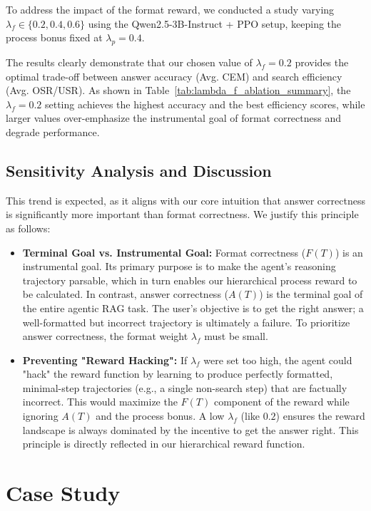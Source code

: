 \documentclass{article}
\begin{document}
To address the impact of the format reward, we conducted a study varying $\lambda_f \in \{0.2, 0.4, 0.6\}$ using the Qwen2.5-3B-Instruct + PPO setup, keeping the process bonus fixed at $\lambda_p = 0.4$.

The results clearly demonstrate that our chosen value of $\lambda_f = 0.2$ provides the optimal trade-off between answer accuracy (Avg. CEM) and search efficiency (Avg. OSR/USR). As shown in Table~\ref{tab:lambda_f_ablation_summary}, the $\lambda_f = 0.2$ setting achieves the highest accuracy and the best efficiency scores, while larger values over-emphasize the instrumental goal of format correctness and degrade performance.


\subsection{Sensitivity Analysis and Discussion}
This trend is expected, as it aligns with our core intuition that answer correctness is significantly more important than format correctness. We justify this principle as follows:

\begin{itemize}
 \item \textbf{Terminal Goal vs. Instrumental Goal:} Format correctness ($F(T)$) is an instrumental goal. Its primary purpose is to make the agent's reasoning trajectory parsable, which in turn enables our hierarchical process reward to be calculated. In contrast, answer correctness ($A(T)$) is the terminal goal of the entire agentic RAG task. The user's objective is to get the right answer; a well-formatted but incorrect trajectory is ultimately a failure. To prioritize answer correctness, the format weight $\lambda_f$ must be small.
 \item \textbf{Preventing "Reward Hacking":} If $\lambda_f$ were set too high, the agent could "hack" the reward function by learning to produce perfectly formatted, minimal-step trajectories (e.g., a single non-search step) that are factually incorrect. This would maximize the $F(T)$ component of the reward while ignoring $A(T)$ and the process bonus. A low $\lambda_f$ (like $0.2$) ensures the reward landscape is always dominated by the incentive to get the answer right. This principle is directly reflected in our hierarchical reward function.
\end{itemize}
\section{Case Study}
\label{sec:case_study}
\end{document}
